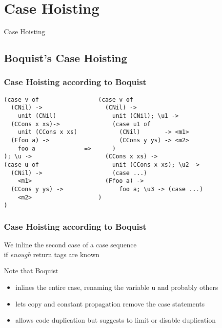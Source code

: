 \documentclass{beamer}
\begin{document}
\section{Case Hoisting}

\begin{frame}[fragile]
\begin{center}
\LARGE{Case Hoisting}
\end{center}
\end{frame}



\subsection{Boquist's Case Hoisting}
\begin{frame}[fragile]
\frametitle{Case Hoisting according to Boquist}

\begin{exampleblock}{}
\begin{verbatim}
(case v of                 (case v of 
  (CNil) ->                  (CNil) -> 
    unit (CNil)                unit (CNil); \u1 ->
  (CCons x xs)->               (case u1 of
    unit (CCons x xs)            (CNil)       -> <m1>
  (Ffoo a) ->                    (CCons y ys) -> <m2> 
    foo a              =>      )
); \u ->                     (CCons x xs) ->
(case u of                     unit (CCons x xs); \u2 ->
  (CNil) ->                    (case ...)
    <m1>                     (Ffoo a) ->
  (CCons y ys) ->                foo a; \u3 -> (case ...)
    <m2>                   )
)                          
\end{verbatim}
\end{exampleblock}
\end{frame}



\begin{frame}[fragile]
\frametitle{Case Hoisting according to Boquist}

We inline the second case of a case sequence \\
if \emph{enough} return tags are known

\vspace{1cm}

Note that Boquist
\begin{itemize}
\item inlines the entire case, renaming the variable u and probably others
\item lets copy and constant propagation remove the case statements
\item allows code duplication but suggests to limit or disable duplication
\end{itemize}

\end{frame}
\end{document}

